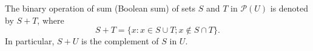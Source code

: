 The binary operation of sum (Boolean sum) of sets $S$ and $T$ in $\mathcal{P}(U)$ is denoted by $S + T$, where
$$S + T = \{x : x \in S \cup T; x \notin S \cap T\}.$$
In particular, $S + U$ is the complement of $S$ in $U$.
